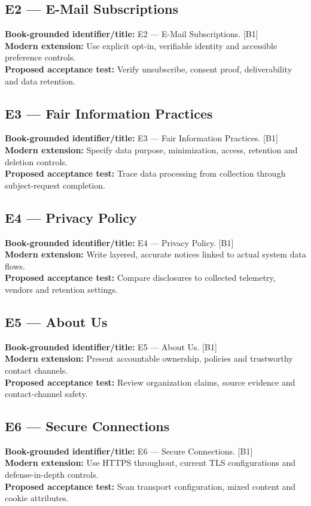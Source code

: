 \documentclass[11pt]{article}
\begin{document}
\subsection{E2 — E-Mail Subscriptions}
\noindent\textcolor{Ocean}{\textbf{Book-grounded identifier/title:}} E2 — E-Mail Subscriptions. [B1]\\
\textcolor{Mint}{\textbf{Modern extension:}} Use explicit opt-in, verifiable identity and accessible preference controls.\\
\textcolor{Amber}{\textbf{Proposed acceptance test:}} Verify unsubscribe, consent proof, deliverability and data retention.\medskip
\subsection{E3 — Fair Information Practices}
\noindent\textcolor{Ocean}{\textbf{Book-grounded identifier/title:}} E3 — Fair Information Practices. [B1]\\
\textcolor{Mint}{\textbf{Modern extension:}} Specify data purpose, minimization, access, retention and deletion controls.\\
\textcolor{Amber}{\textbf{Proposed acceptance test:}} Trace data processing from collection through subject-request completion.\medskip
\subsection{E4 — Privacy Policy}
\noindent\textcolor{Ocean}{\textbf{Book-grounded identifier/title:}} E4 — Privacy Policy. [B1]\\
\textcolor{Mint}{\textbf{Modern extension:}} Write layered, accurate notices linked to actual system data flows.\\
\textcolor{Amber}{\textbf{Proposed acceptance test:}} Compare disclosures to collected telemetry, vendors and retention settings.\medskip
\subsection{E5 — About Us}
\noindent\textcolor{Ocean}{\textbf{Book-grounded identifier/title:}} E5 — About Us. [B1]\\
\textcolor{Mint}{\textbf{Modern extension:}} Present accountable ownership, policies and trustworthy contact channels.\\
\textcolor{Amber}{\textbf{Proposed acceptance test:}} Review organization claims, source evidence and contact-channel safety.\medskip
\subsection{E6 — Secure Connections}
\noindent\textcolor{Ocean}{\textbf{Book-grounded identifier/title:}} E6 — Secure Connections. [B1]\\
\textcolor{Mint}{\textbf{Modern extension:}} Use HTTPS throughout, current TLS configurations and defense-in-depth controls.\\
\textcolor{Amber}{\textbf{Proposed acceptance test:}} Scan transport configuration, mixed content and cookie attributes.\medskip
\end{document}
